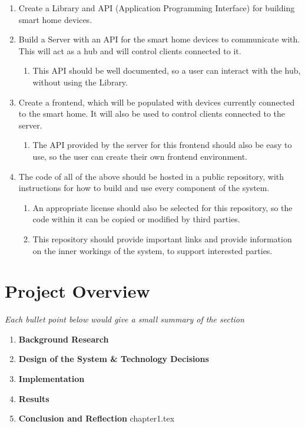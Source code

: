 \begin{enumerate}
    \item Create a Library and API (Application Programming Interface) for 
        building smart home devices.
    \item Build a Server with an API for the smart home devices to communicate 
        with. This will act as a hub and will control clients connected to it.
         \begin{enumerate}
             \item This API should be well documented, so a user can interact 
                 with the hub, without using the Library.
         \end{enumerate}
     \item Create a frontend, which will be populated with devices currently 
         connected to the smart home. It will also be used to control clients 
         connected to the server.
         \begin{enumerate}
             \item The API provided by the server for this frontend should also 
                 be easy to use, so the user can create their own frontend 
                 environment.
         \end{enumerate}
     \item The code of all of the above should be hosted in a public repository, 
         with instructions for how to build and use every component of the 
         system.
         \begin{enumerate}
             \item An appropriate license should also be selected for this 
                 repository, so the code within it can be copied or modified by 
                 third parties.
             \item This repository should provide important links and provide 
                 information on the inner workings of the system, to support 
                 interested parties.
         \end{enumerate}
\end{enumerate}
    
\section{Project Overview} \label{sec:intro:overview} 
\textit{Each bullet point below would give a small summary of the section}
\begin{enumerate}
    \item \textbf{Background Research} 
    \item \textbf{Design of the System \& Technology Decisions}
    \item \textbf{Implementation}
    \item \textbf{Results}
    \item \textbf{Conclusion and Reflection}
chapter1.tex
\end{enumerate}
